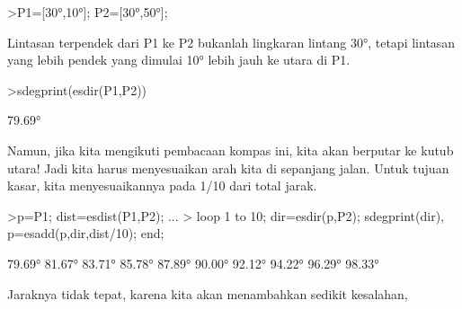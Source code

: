 \documentclass[a4paper,10pt]{article}
\begin{document}
\begin{eulernotebook}
\begin{eulercomment}
\begin{eulercomment}
\begin{eulercomment}
\begin{eulercomment}
\begin{eulercomment}
\begin{eulercomment}
\begin{eulercomment}
\begin{eulercomment}
\begin{eulercomment}
\begin{eulercomment}
\begin{eulercomment}
\begin{eulercomment}
\begin{eulercomment}
\begin{eulercomment}
\begin{eulercomment}
\begin{eulercomment}
\begin{eulercomment}
\begin{eulercomment}
\begin{eulercomment}
\begin{eulercomment}
\begin{eulercomment}
\begin{eulercomment}
\begin{eulercomment}
\begin{eulercomment}
\begin{eulercomment}
\begin{eulercomment}
\begin{eulercomment}
\begin{eulercomment}
\begin{eulercomment}
\begin{eulercomment}
\begin{eulercomment}
\begin{eulercomment}
\begin{eulercomment}
\begin{eulercomment}
\begin{eulercomment}
\begin{eulercomment}
\begin{eulercomment}
\begin{eulercomment}
\begin{eulercomment}
\begin{eulercomment}
\begin{eulercomment}
\begin{eulercomment}
\begin{eulerprompt}
>P1=[30°,10°]; P2=[30°,50°];
\end{eulerprompt}
\begin{eulercomment}
Lintasan terpendek dari P1 ke P2 bukanlah lingkaran lintang 30°,
tetapi lintasan yang lebih pendek yang dimulai 10° lebih jauh ke utara
di P1.
\end{eulercomment}
\begin{eulerprompt}
>sdegprint(esdir(P1,P2))
\end{eulerprompt}
\begin{euleroutput}
       79.69°
\end{euleroutput}
\begin{eulercomment}
Namun, jika kita mengikuti pembacaan kompas ini, kita akan berputar ke
kutub utara! Jadi kita harus menyesuaikan arah kita di sepanjang
jalan. Untuk tujuan kasar, kita menyesuaikannya pada 1/10 dari total
jarak.
\end{eulercomment}
\begin{eulerprompt}
>p=P1;  dist=esdist(P1,P2); ...
>  loop 1 to 10; dir=esdir(p,P2); sdegprint(dir), p=esadd(p,dir,dist/10); end;
\end{eulerprompt}
\begin{euleroutput}
       79.69°
       81.67°
       83.71°
       85.78°
       87.89°
       90.00°
       92.12°
       94.22°
       96.29°
       98.33°
\end{euleroutput}
\begin{eulercomment}
Jaraknya tidak tepat, karena kita akan menambahkan sedikit kesalahan,

\end{eulercomment}
\end{eulercomment}
\end{eulercomment}
\end{eulercomment}
\end{eulercomment}
\end{eulercomment}
\end{eulercomment}
\end{eulercomment}
\end{eulercomment}
\end{eulercomment}
\end{eulercomment}
\end{eulercomment}
\end{eulercomment}
\end{eulercomment}
\end{eulercomment}
\end{eulercomment}
\end{eulercomment}
\end{eulercomment}
\end{eulercomment}
\end{eulercomment}
\end{eulercomment}
\end{eulercomment}
\end{eulercomment}
\end{eulercomment}
\end{eulercomment}
\end{eulercomment}
\end{eulercomment}
\end{eulercomment}
\end{eulercomment}
\end{eulercomment}
\end{eulercomment}
\end{eulercomment}
\end{eulercomment}
\end{eulercomment}
\end{eulercomment}
\end{eulercomment}
\end{eulercomment}
\end{eulercomment}
\end{eulercomment}
\end{eulercomment}
\end{eulercomment}
\end{eulercomment}
\end{eulercomment}
\end{eulernotebook}
\end{document}
